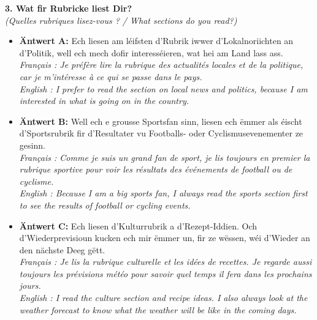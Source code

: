 \noindent\textbf{3. Wat fir Rubricke liest Dir?}\\
\textit{(Quelles rubriques lisez-vous ? / What sections do you read?)}
\begin{itemize}
    \item \textbf{Äntwert A:} Ech liesen am léifsten d'Rubrik iwwer d'Lokalnoriichten an d'Politik, well ech mech dofir interesséieren, wat hei am Land lass ass.\\
    \textit{Français : Je préfère lire la rubrique des actualités locales et de la politique, car je m'intéresse à ce qui se passe dans le pays.}\\
    \textit{English : I prefer to read the section on local news and politics, because I am interested in what is going on in the country.}
    \item \textbf{Äntwert B:} Well ech e grousse Sportsfan sinn, liesen ech ëmmer als éischt d'Sportsrubrik fir d'Resultater vu Footballs- oder Cyclismusevenementer ze gesinn.\\
    \textit{Français : Comme je suis un grand fan de sport, je lis toujours en premier la rubrique sportive pour voir les résultats des événements de football ou de cyclisme.}\\
    \textit{English : Because I am a big sports fan, I always read the sports section first to see the results of football or cycling events.}
    \item \textbf{Äntwert C:} Ech liesen d'Kulturrubrik a d'Rezept-Iddien. Och d'Wiederprevisioun kucken ech mir ëmmer un, fir ze wëssen, wéi d'Wieder an den nächste Deeg gëtt.\\
    \textit{Français : Je lis la rubrique culturelle et les idées de recettes. Je regarde aussi toujours les prévisions météo pour savoir quel temps il fera dans les prochains jours.}\\
    \textit{English : I read the culture section and recipe ideas. I also always look at the weather forecast to know what the weather will be like in the coming days.}
\end{itemize}
\vspace{0.5em}

